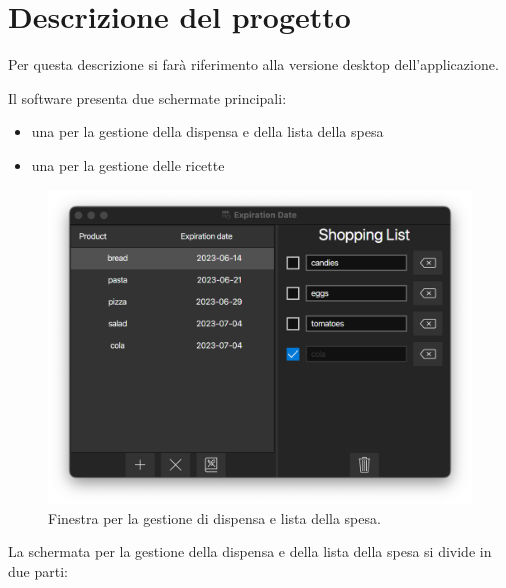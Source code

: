 \chapter{Descrizione del progetto}

Per questa descrizione si farà riferimento alla versione desktop dell'applicazione.

Il software presenta due schermate principali:

\begin{itemize}

  \item una per la gestione della dispensa e della lista della spesa
  \item una per la gestione delle ricette

\end{itemize}

\begin{figure}[H]
    \includegraphics[width=\linewidth]{images/main-view.png}
    \caption{Finestra per la gestione di dispensa e lista della spesa.}
    \label{fig:mainview}
\end{figure}

La schermata per la gestione della dispensa e della lista della spesa si divide in due parti:

